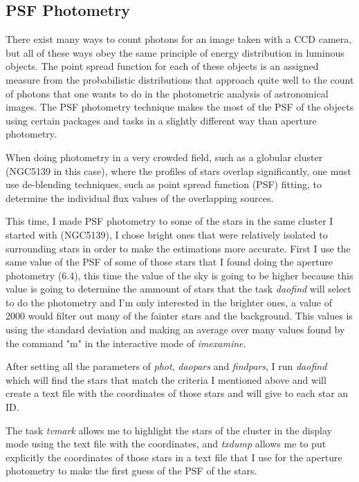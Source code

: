 \subsection{PSF Photometry}

There exist many ways to count photons for an image taken with a CCD camera, but all of these ways obey the same principle of energy distribution in luminous objects. The point spread function for each of these objects is an assigned measure from the probabilistic distributions that approach quite well to the count of photons that one wants to do in the photometric analysis of astronomical images. The PSF photometry technique makes the most of the PSF of the objects using certain packages and tasks in a slightly different way than aperture photometry.

When doing photometry in a very crowded field, such as a globular cluster (NGC5139 in this case), where the profiles of stars overlap significantly, one must use de-blending techniques, such as point spread function (PSF) fitting, to determine the individual flux values of the overlapping sources. 

This time, I made PSF photometry to some of the stars in the same cluster I started with (NGC5139), I chose bright ones that were relatively isolated to surrounding stars in order to make the estimations more accurate. First I use the same value of the PSF of some of those stars that I found doing the aperture photometry (6.4), this time the value of the sky is going to be higher because this value is going to determine the ammount of stars that the task \textit{daofind} will select to do the photometry and I'm only interested in the brighter ones, a value of 2000 would filter out many of the fainter stars and the background. This values is using the standard deviation and making an average over many values found by the command "m" in the interactive mode of \textit{imexamine}. 

After setting all the parameters of \textit{phot}, \textit{daopars} and \textit{findpars}, I run \textit{daofind} which will find the stars that match the criteria I mentioned above and will create a text file with the coordinates of those stars and will give to each star an ID.

The task \textit{tvmark} allows me to highlight the stars of the cluster in the display mode using the text file with the coordinates, and \textit{txdump} allows me to  put explicitly the coordinates of those stars in a text file that I use for the aperture photometry to make the first guess of the PSF of the stars.

